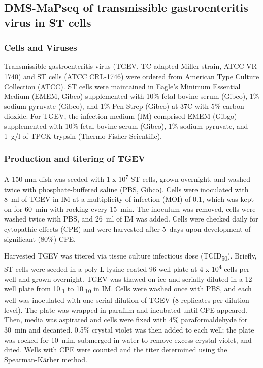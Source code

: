 \documentclass[main.tex]{subfiles}
\begin{document}
\subsection{DMS-MaPseq of transmissible gastroenteritis virus in ST cells}

\subsubsection{Cells and Viruses}

Transmissible gastroenteritis virus (TGEV, TC-adapted Miller strain, ATCC VR-1740) and ST cells (ATCC CRL-1746) were ordered from American Type Culture Collection (ATCC).
ST cells were maintained in Eagle's Minimum Essential Medium (EMEM, Gibco) supplemented with 10\% fetal bovine serum (Gibco), 1\% sodium pyruvate (Gibco), and 1\% Pen Strep (Gibco) at 37\textdegree C with 5\% carbon dioxide.
For TGEV, the infection medium (IM) comprised EMEM (Gibgo) supplemented with 10\% fetal bovine serum (Gibco), 1\% sodium pyruvate, and 1~\textmu g/\textmu l of TPCK trypsin (Thermo Fisher Scientific).

\subsubsection{Production and titering of TGEV}

A 150 mm dish was seeded with 1 x 10\textsuperscript{7} ST cells, grown overnight, and washed twice with phosphate-buffered saline (PBS, Gibco).
Cells were inoculated with 8~ml of TGEV in IM at a multiplicity of infection (MOI) of 0.1, which was kept on for 60~min with rocking every 15~min.
The inoculum was removed, cells were washed twice with PBS, and 26~ml of IM was added.
Cells were checked daily for cytopathic effects (CPE) and were harvested after 5~days upon development of significant (80\%) CPE.

Harvested TGEV was titered via tissue culture infectious dose (TCID\textsubscript{50}).
Briefly, ST cells were seeded in a poly-L-lysine coated 96-well plate at 4 x 10\textsuperscript{4} cells per well and grown overnight.
TGEV was thawed on ice and serially diluted in a 12-well plate from 10\textsubscript{-1} to 10\textsubscript{-10} in IM.
Cells were washed once with PBS, and each well was inoculated with one serial dilution of TGEV (8 replicates per dilution level).
The plate was wrapped in parafilm and incubated until CPE appeared.
Then, media was aspirated and cells were fixed with 4\% paraformaldehyde for 30~min and decanted.
0.5\% crystal violet was then added to each well; the plate was rocked for 10~min, submerged in water to remove excess crystal violet, and dried.
Wells with CPE were counted and the titer determined using the Spearman-Kärber method.
\end{document}
